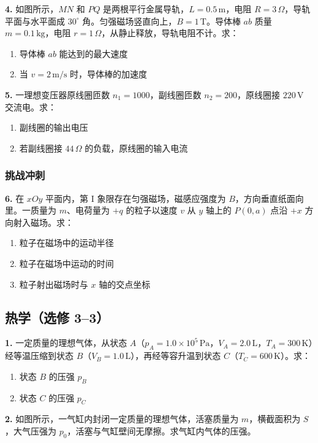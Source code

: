 \textbf{4.} 如图所示，$MN$ 和 $PQ$ 是两根平行金属导轨，$L = 0.5\,\text{m}$，电阻 $R = 3\,\Omega$，导轨平面与水平面成 $30^\circ$ 角。匀强磁场竖直向上，$B = 1\,\text{T}$。导体棒 $ab$ 质量 $m = 0.1\,\text{kg}$，电阻 $r = 1\,\Omega$，从静止释放，导轨电阻不计。求：
\begin{enumerate}
  \item 导体棒 $ab$ 能达到的最大速度
  \item 当 $v = 2\,\text{m/s}$ 时，导体棒的加速度
\end{enumerate}

\textbf{5.} 一理想变压器原线圈匝数 $n_1 = 1000$，副线圈匝数 $n_2 = 200$，原线圈接 $220\,\text{V}$ 交流电。求：
\begin{enumerate}
  \item 副线圈的输出电压
  \item 若副线圈接 $44\,\Omega$ 的负载，原线圈的输入电流
\end{enumerate}

\subsubsection{挑战冲刺}

\textbf{6.} 在 $xOy$ 平面内，第 I 象限存在匀强磁场，磁感应强度为 $B$，方向垂直纸面向里。一质量为 $m$、电荷量为 $+q$ 的粒子以速度 $v$ 从 $y$ 轴上的 $P(0,a)$ 点沿 $+x$ 方向射入磁场。求：
\begin{enumerate}
  \item 粒子在磁场中的运动半径
  \item 粒子在磁场中运动的时间
  \item 粒子射出磁场时与 $x$ 轴的交点坐标
\end{enumerate}

\subsection{热学（选修 3--3）}

\textbf{1.} 一定质量的理想气体，从状态 $A$（$p_A = 1.0\times10^5\,\text{Pa}$，$V_A = 2.0\,\text{L}$，$T_A = 300\,\text{K}$）经等温压缩到状态 $B$（$V_B = 1.0\,\text{L}$），再经等容升温到状态 $C$（$T_C = 600\,\text{K}$）。求：
\begin{enumerate}
  \item 状态 $B$ 的压强 $p_B$
  \item 状态 $C$ 的压强 $p_C$
\end{enumerate}

\textbf{2.} 如图所示，一气缸内封闭一定质量的理想气体，活塞质量为 $m$，横截面积为 $S$，大气压强为 $p_0$，活塞与气缸壁间无摩擦。求气缸内气体的压强。

